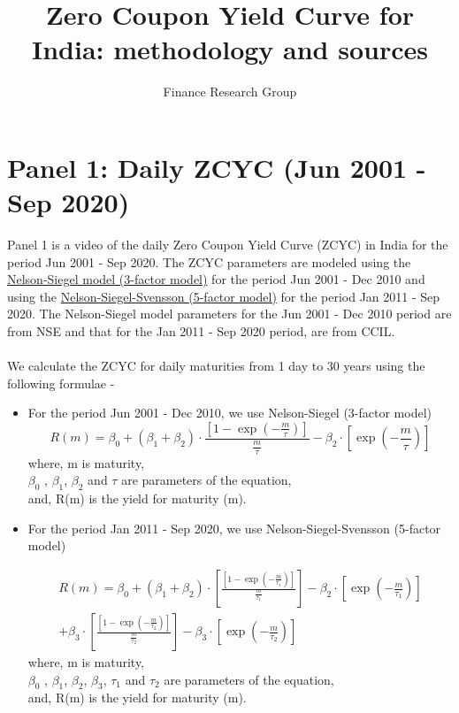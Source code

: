 \documentclass[12pt]{article}
\date{}
\begin{document}
\begin{titlepage}
  \title{Zero Coupon Yield Curve for India: methodology and sources}
  \author{Finance Research Group}
  \maketitle
\end{titlepage}
\section*{Panel 1: Daily ZCYC (Jun 2001 - Sep 2020) }
Panel 1 is a video of the daily Zero Coupon Yield Curve (ZCYC) in India for the period Jun 2001 - Sep 2020. 
The ZCYC parameters are modeled using the \href{https://econpapers.repec.org/article/ucpjnlbus/v_3a60_3ay_3a1987_3ai_3a4_3ap_3a473-89.htm}{Nelson-Siegel model (3-factor model)} for the period Jun 2001 - Dec 2010 and using the \href{https://econpapers.repec.org/paper/nbrnberwo/4871.htm}{Nelson-Siegel-Svensson (5-factor model)} for the period Jan 2011 - Sep 2020. 
The Nelson-Siegel model parameters for the Jun 2001 - Dec 2010 period are from NSE and that for the Jan 2011 - Sep 2020 period, are from CCIL. \\ \\

We calculate the ZCYC for daily maturities from 1 day to 30 years using the following formulae - 
\begin{itemize}
\item For the period Jun 2001 - Dec 2010, we use Nelson-Siegel (3-factor model)
  \begin{equation}
    R(m)= \beta_0 + (\beta_1 + \beta_2)\cdot\frac{[1-\exp(-\frac{m}{\tau})]}{\frac{m}{\tau}} - \beta_2\cdot[\exp(-\frac{m}{\tau})] 
  \end{equation}
  where, m is maturity,\\
  $\beta_0$ , $\beta_1$, $\beta_2$ and $\tau$ are parameters of the equation,\\
  and, R(m) is the yield for maturity (m).
  
\item For the period Jan 2011 - Sep 2020, we use Nelson-Siegel-Svensson (5-factor model) 
  
  \begin{equation}
\begin{split}
  R(m)= \beta_0 + (\beta_1 + \beta_2)\cdot[\frac{[1-\exp(-\frac{m}{\tau_1})]}{\frac{m}{\tau_1}}]  - \beta_2\cdot[\exp(-\frac{m}{\tau_1})]\\
  + \beta_3\cdot[\frac{[1-\exp(-\frac{m}{\tau_2})]}{\frac{m}{\tau_2}}]  - \beta_3\cdot[\exp(-\frac{m}{\tau_2})] 
\end{split}
\end{equation}
  where, m is maturity,\\
  $\beta_0$ , $\beta_1$, $\beta_2$, $\beta_3$, $\tau_1$ and $\tau_2$ are parameters of the equation,\\
  and, R(m) is the yield for maturity (m).

\end{itemize} 
\end{document}

